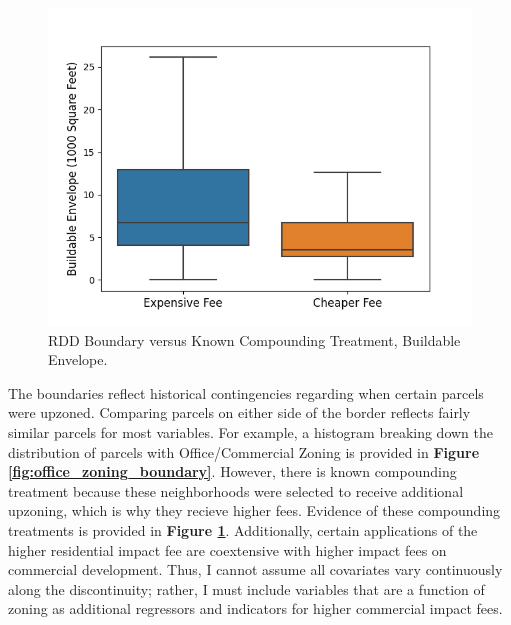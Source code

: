 \documentclass[a4paper,12pt]{article}
\begin{document}
\begin{figure}[hbt]
    \centering
    \includegraphics[scale=.8]{rdd/Envelope_boundary.png}
    \caption{RDD Boundary versus Known Compounding Treatment, Buildable Envelope.}
    \label{fig:Envelope_boundary}
\end{figure}

The boundaries reflect historical contingencies regarding when certain parcels were upzoned. Comparing parcels on either side of the border reflects fairly similar parcels for most variables. For example, a histogram breaking down the distribution of parcels with Office/Commercial Zoning is provided in \textbf{Figure \ref{fig:office_zoning_boundary}}. However, there is known compounding treatment because these neighborhoods were selected to receive additional upzoning, which is why they recieve higher fees. Evidence of these compounding treatments is provided in \textbf{Figure \ref{fig:Envelope_boundary}}. Additionally, certain applications of the higher residential impact fee are coextensive with higher impact fees on commercial development. Thus, I cannot assume all covariates vary continuously along the discontinuity; rather, I must include variables that are a function of zoning as additional regressors and indicators for higher commercial impact fees.
\end{document}
